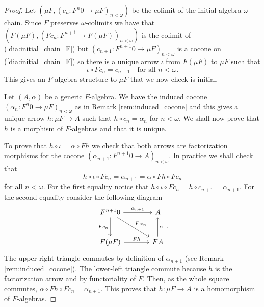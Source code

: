 \documentclass[letterpaper, 11pt, oneside]{memoir}
\theoremstyle{myteo}
\numberwithin{equation}{section}
\begin{document}
\begin{proof}
  Let \((\mu F, (c_n \colon F^n0 \to \mu F)_{n < \omega})\) be the colimit of the initial-algebra \(\omega\)-chain.
  Since \(F\) preserves \(\omega\)-colimits we have that \((F(\mu F), (Fc_n \colon F^{n+1} \to F(\mu F))_{n < \omega})\) is the colimit of (\ref{dia:initial_chain_F}) but \((c_{n+1} \colon F^{n+1}0 \to \mu F)_{n < \omega}\) is a cocone on (\ref{dia:initial_chain_F}) so there is a unique arrow \(\iota\) from \(F(\mu F)\) to \(\mu F\) such that
  \begin{equation}
    \label{eq:iota}
    \iota \circ Fc_n = c_{n + 1} \quad \text{for all \(n < \omega\).}
  \end{equation}
  This gives an \(F\)-algebra structure to \(\mu F\) that we now check is initial.

  Let \((A, \alpha)\) be a generic \(F\)-algebra.
  We have the induced cocone \((\alpha_n \colon F^n0 \to \mu F)_{n < \omega}\) as in Remark \ref{rem:induced_cocone} and this gives a unique arrow \(h \colon \mu F \to A\) such that \(h \circ c_n = \alpha_n\) for \(n < \omega\).
  We shall now prove that \(h\) is a morphism of \(F\)-algebras and that it is unique.

  To prove that \( h \circ \iota = \alpha \circ Fh\) we check that both arrows are factorization morphisms for the cocone \((\alpha_{n + 1} \colon F^{n+1}0 \to A)_{n < \omega}\).
  In practice we shall check that
  \begin{equation*}
    h \circ \iota \circ Fc_n = \alpha_{n + 1} = \alpha \circ Fh \circ Fc_n
  \end{equation*}
  for all \(n < \omega\).
  For the first equality notice that \(h \circ \iota \circ Fc_n = h \circ c_{n+1} = \alpha_{n+1}\).
  For the second equality consider the following diagram
  \begin{equation*}
    \begin{tikzcd}[sep = large]
      F^{n+1}0 \ar[r, "\alpha_{n+1}"] \ar[d, "Fc_n"'] \ar[dr, "F\alpha_n"] & A \\
      F(\mu F) \ar[r, "Fh"] & FA \ar[u, "\alpha"']
    \end{tikzcd}.
  \end{equation*}
  The upper-right triangle commutes by definition of \(\alpha_{n + 1}\) (see Remark \ref{rem:induced_cocone}).
  The lower-left triangle commute because \(h\) is the factorization arrow and by functoriality of \(F\).
  Then, as the whole square commutes, \(\alpha \circ Fh \circ Fc_n = \alpha_{n+1}\).
  This proves that \(h \colon \mu F \to A\) is a homomorphism of \(F\)-algebras.


\end{proof}
\end{document}

